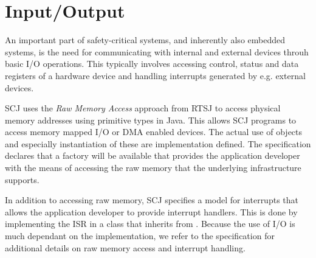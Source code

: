 \section{Input/Output}
\label{section:inputOutput}
An important part of safety-critical systems, and inherently also embedded systems, is the need for communicating with internal and external devices throuh basic I/O operations. This typically involves accessing control, status and data registers of a hardware device and handling interrupts generated by e.g. external devices.

SCJ uses the \textit{Raw Memory Access} approach from RTSJ to access physical memory addresses using primitive types in Java. This allows SCJ programs to access memory mapped I/O or DMA enabled devices. The actual use of  objects and especially instantiation of these are implementation defined. The specification declares that a factory will be available that provides the application developer with the means of accessing the raw memory that the underlying infrastructure supports.

In addition to accessing raw memory, SCJ specifies a model for interrupts that allows the application developer to provide interrupt handlers. This is done by implementing the ISR in a class that inherits from . Because the use of I/O is much dependant on the implementation, we refer to the specification for additional details on raw memory access and interrupt handling.